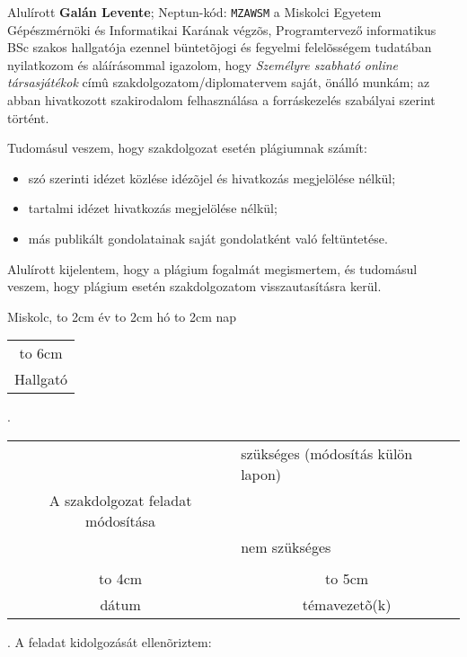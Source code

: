 Alulírott \textbf{Galán Levente}; Neptun-kód: \texttt{MZAWSM} a Miskolci Egyetem Gépészmérnöki és Informatikai Karának végzõs, Programtervező informatikus BSc szakos hallgatója ezennel büntetõjogi és fegyelmi felelõsségem tudatában nyilatkozom és aláírásommal igazolom, hogy
\textit{
Személyre szabható online társasjátékok
}
címû szakdolgozatom/diplomatervem saját, önálló munkám; az abban hivatkozott szakirodalom
felhasználása a forráskezelés szabályai szerint történt.

Tudomásul veszem, hogy szakdolgozat esetén plágiumnak számít:
\begin{itemize}
\item szó szerinti idézet közlése idézõjel és hivatkozás megjelölése nélkül;
\item tartalmi idézet hivatkozás megjelölése nélkül;
\item más publikált gondolatainak saját gondolatként való feltüntetése.
\end{itemize}

Alulírott kijelentem, hogy a plágium fogalmát megismertem, és tudomásul veszem, hogy
plágium esetén szakdolgozatom visszautasításra kerül.

\vspace*{3cm}

\noindent Miskolc, \hbox to 2cm{\dotfill} év \hbox to 2cm{\dotfill} hó \hbox to 2cm{\dotfill} nap

\vspace*{3cm}

\hspace*{8cm}\begin{tabular}{c}
\hbox to 6cm{\dotfill}\\
Hallgató
\end{tabular}

\newpage

.

\begin{tabular}{cl}
	&szükséges (módosítás külön lapon) \\
	A szakdolgozat feladat módosítása& \\
	& nem szükséges\\
	&\\
	\hbox to 4cm{\dotfill}&\multicolumn{1}{c}{\hbox to 5cm{\dotfill}}\\
	dátum& \multicolumn{1}{c}{témavezetõ(k)}
\end{tabular}
\vskip1.5mm

. A feladat kidolgozását ellenõriztem:

